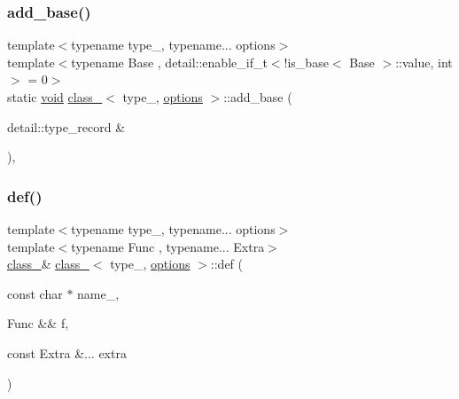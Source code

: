 \mbox{\label{classclass___a3e06e8a15ef89f19a08a9ca0bf8277de}} 
\subsubsection{\texorpdfstring{add\_base()}{add\_base()}\hspace{0.1cm}{\footnotesize\ttfamily [2/2]}}
{\footnotesize\ttfamily template$<$typename type\+\_\+, typename... options$>$ \\
template$<$typename Base , detail\+::enable\+\_\+if\+\_\+t$<$!is\+\_\+base$<$ Base $>$\+::value, int $>$  = 0$>$ \\
static \mbox{\hyperlink{_s_d_l__opengles2__gl2ext_8h_ae5d8fa23ad07c48bb609509eae494c95}{void}} \mbox{\hyperlink{classclass__}{class\+\_\+}}$<$ type\+\_\+, \mbox{\hyperlink{classoptions}{options}} $>$\+::add\+\_\+base (\begin{DoxyParamCaption}\item[{detail\+::type\+\_\+record \&}]{ }\end{DoxyParamCaption})\hspace{0.3cm}{\ttfamily [inline]}, {\ttfamily [static]}}

\mbox{\label{classclass___a94b10f477ed961e4b85ea7da9eda16c7}} 
\subsubsection{\texorpdfstring{def()}{def()}\hspace{0.1cm}{\footnotesize\ttfamily [1/6]}}
{\footnotesize\ttfamily template$<$typename type\+\_\+, typename... options$>$ \\
template$<$typename Func , typename... Extra$>$ \\
\mbox{\hyperlink{classclass__}{class\+\_\+}}\& \mbox{\hyperlink{classclass__}{class\+\_\+}}$<$ type\+\_\+, \mbox{\hyperlink{classoptions}{options}} $>$\+::def (\begin{DoxyParamCaption}\item[{const char $\ast$}]{name\+\_\+,  }\item[{Func \&\&}]{f,  }\item[{const Extra \&...}]{extra }\end{DoxyParamCaption})\hspace{0.3cm}{\ttfamily [inline]}}


